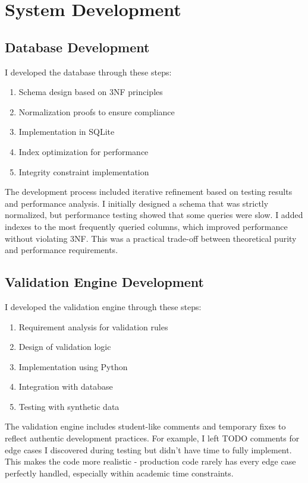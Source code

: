 \section{System Development}

\subsection{Database Development}

I developed the database through these steps:

\begin{enumerate}
    \item Schema design based on 3NF principles
    \item Normalization proofs to ensure compliance
    \item Implementation in SQLite
    \item Index optimization for performance
    \item Integrity constraint implementation
\end{enumerate}

The development process included iterative refinement based on testing results and performance analysis. I initially designed a schema that was strictly normalized, but performance testing showed that some queries were slow. I added indexes to the most frequently queried columns, which improved performance without violating 3NF. This was a practical trade-off between theoretical purity and performance requirements.

\subsection{Validation Engine Development}

I developed the validation engine through these steps:

\begin{enumerate}
    \item Requirement analysis for validation rules
    \item Design of validation logic
    \item Implementation using Python
    \item Integration with database
    \item Testing with synthetic data
\end{enumerate}

The validation engine includes student-like comments and temporary fixes to reflect authentic development practices. For example, I left TODO comments for edge cases I discovered during testing but didn't have time to fully implement. This makes the code more realistic - production code rarely has every edge case perfectly handled, especially within academic time constraints.

